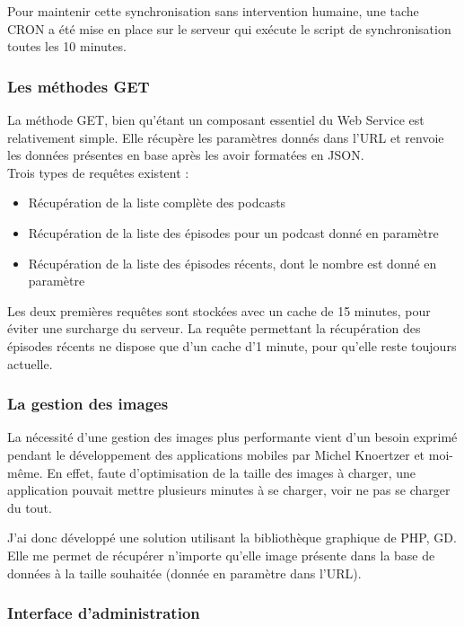 \documentclass[11pt, french]{report}
\begin{document}
Pour maintenir cette synchronisation sans intervention humaine, une tache CRON a été mise en place sur le serveur qui exécute le script de synchronisation toutes les 10 minutes.

\subsubsection{Les méthodes GET}

La méthode GET, bien qu'étant un composant essentiel du Web Service est relativement simple. Elle récupère les paramètres donnés dans l'URL et renvoie les données présentes en base après les avoir formatées en JSON.\\

Trois types de requêtes existent :
\begin{itemize}
	\item Récupération de la liste complète des podcasts
	\item Récupération de la liste des épisodes pour un podcast donné en paramètre
	\item Récupération de la liste des épisodes récents, dont le nombre est donné en paramètre\\
\end{itemize}

Les deux premières requêtes sont stockées avec un cache de 15 minutes, pour éviter une surcharge du serveur. La requête permettant la récupération des épisodes récents ne dispose que d'un cache d'1 minute, pour qu'elle reste toujours actuelle.

\subsubsection{La gestion des images}

La nécessité d'une gestion des images plus performante vient d'un besoin exprimé pendant le développement des applications mobiles par Michel Knoertzer et moi-même. En effet, faute d'optimisation de la taille des images à charger, une application pouvait mettre plusieurs minutes à se charger, voir ne pas se charger du tout.

J'ai donc développé une solution utilisant la bibliothèque graphique de PHP, GD. Elle me permet de récupérer n'importe qu'elle image présente dans la base de données à la taille souhaitée (donnée en paramètre dans l'URL).

\subsubsection{Interface d'administration}
\end{document}

